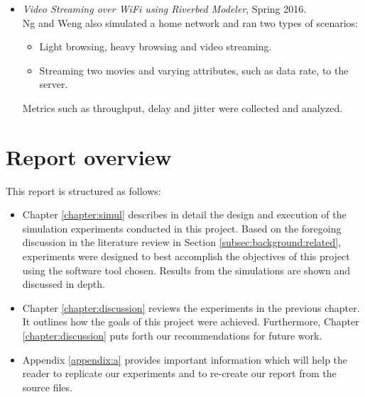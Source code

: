 \begin{itemize}
	\item \textit{Video Streaming over \gls{WiFi} using Riverbed Modeler}, Spring 2016. \cite{michaelng} \\
	Ng and Weng also simulated a home network and ran two types of scenarios: \begin{itemize}
		\item Light browsing, heavy browsing and video streaming.
		\item Streaming two movies and varying attributes, such as data rate, to the server.
	\end{itemize}
	Metrics such as throughput, delay and jitter were collected and analyzed. \cite{michaelng}
\end{itemize}

%
%

\section{Report overview} \label{sec:overview}
This report is structured as follows:
\begin{itemize}
	\item Chapter \ref{chapter:simul} describes in detail the design and execution of the simulation experiments conducted in this project. Based on the foregoing discussion in the literature review in Section \ref{subsec:background:related}, experiments were designed to best accomplish the objectives of this project using the software tool chosen. Results from the simulations are shown and discussed in depth.
	\item Chapter \ref{chapter:discussion} reviews the experiments in the previous chapter. It outlines how the goals of this project were achieved. Furthermore, Chapter \ref{chapter:discussion} puts forth our recommendations for future work.
	\item Appendix \ref{appendix:a} provides important information which will help the reader to replicate our experiments and to re-create our report from the source files. 
\end{itemize}